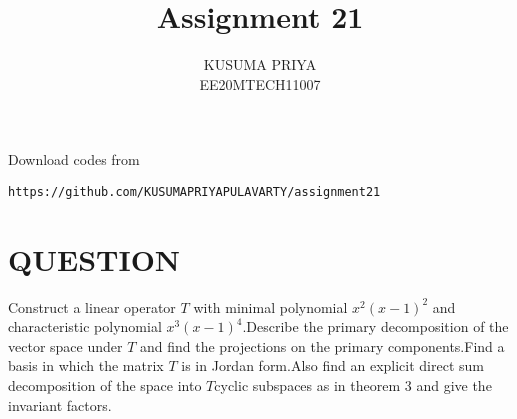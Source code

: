 \documentclass[journal,12pt,twocolumn]{IEEEtran}
\begin{document}
\renewcommand{\thefigure}{\theproblem}

\def\putbox#1#2#3{\makebox[0in][l]{\makebox[#1][l]{}\raisebox{\baselineskip}[0in][0in]{\raisebox{#2}[0in][0in]{#3}}}}
     \def\rightbox#1{\makebox[0in][r]{#1}}
     \def\centbox#1{\makebox[0in]{#1}}
     \def\topbox#1{\raisebox{-\baselineskip}[0in][0in]{#1}}
     \def\midbox#1{\raisebox{-0.5\baselineskip}[0in][0in]{#1}}
\vspace{3cm}
\title{Assignment 21}
\author{KUSUMA PRIYA\\EE20MTECH11007}

\maketitle
\newpage

\bigskip
\renewcommand{\thefigure}{\theenumi}
\renewcommand{\thetable}{\theenumi}
Download codes from 
%
\begin{lstlisting}
https://github.com/KUSUMAPRIYAPULAVARTY/assignment21
\end{lstlisting}
%
 
\section{QUESTION}
Construct a linear operator $T$ with minimal polynomial $x^2(x-1)^2$ and characteristic polynomial $x^3(x-1)^4$.Describe the primary decomposition of the vector space under $T$ and find the projections on the primary components.Find a basis in which the matrix $T$ is in Jordan form.Also find an explicit direct sum decomposition of the space into $T$cyclic subspaces as in theorem 3 and give the invariant factors.

%
\end{document}
